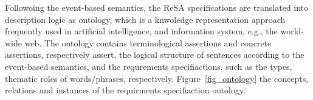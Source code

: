 Followoing the event-based semantics, the ReSA specifications are translated into description logic as ontology, which is a knwoledge representation approach frequently used in artificial intelligence, and information system, e.g., the world-wide web. The ontology contains terminological assertions and concrete assertions, respectively assert, the logical structure of sentences according to the event-based semantics, and the requrements specifiactions, such as the types, thematic roles of words/phrases, respectively. Figure~\ref{fig_ontology} the concepts, relations and instances of the requirments specifiaction ontology.
\begin{figure}[h] 
	\centering
	 \hfill
\hfill
{}
\end{figure}
